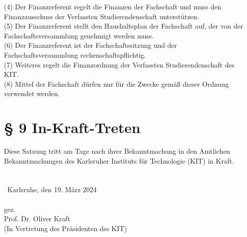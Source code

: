 \documentclass[a4paper, parskip=half, numbers=noenddot]{scrartcl}
\begin{document}
(4) Der Finanzreferent regelt die Finanzen der Fachschaft und muss den Finanzausschuss der Verfassten Studierendenschaft unterstützen.\\

(5) Der Finanzreferent stellt den Haushaltsplan der Fachschaft auf, der von der Fachschaftsversammlung genehmigt werden muss.\\

(6) Der Finanzreferent ist der Fachschaftssitzung und der Fachschaftsversammlung rechenschaftspflichtig.\\

(7) Weiteres regelt die Finanzordnung der Verfassten Studierendenschaft des KIT.\\

(8) Mittel der Fachschaft dürfen nur für die Zwecke gemäß dieser Ordnung verwendet werden.\\



%
%


\section*{§ 9 In-Kraft-Treten}

Diese Satzung tritt am Tage nach ihrer Bekanntmachung in den Amtlichen Bekanntmachungen des Karlsruher Instituts für Technologie (KIT) in Kraft.\\\\\\\
Karlsruhe, den 19. März 2024\\\\
gez.\\
Prof. Dr. Oliver Kraft\\
(In Vertretung des Präsidenten des KIT)
\end{document}
